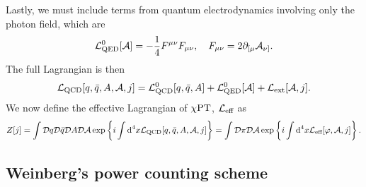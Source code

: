 Lastly, we must include terms from quantum electrodynamics involving only the photon field, which are
%
\begin{equation}
    \mathcal{L}^0_\text{QED}[\mathcal A] 
    = -\frac{1}{4} F^{\mu \nu}F_{\mu \nu}, \quad
    F_{\mu \nu} = 2 \partial_{[\mu}\mathcal A_{\nu]}.
\end{equation}
%
The full Lagrangian is then
%
\begin{equation}
    \mathcal{L}_\text{QCD}[q, \bar q, A,\mathcal A, j] = \mathcal{L}_\text{QCD}^0[q, \bar q, A] + \mathcal{L}^0_\text{QED}[\mathcal A] + \mathcal{L}_\text{ext}[\mathcal A, j].
\end{equation}
%
We now define the effective Lagrangian of $\chi \text{PT}$, $\mathcal{L}_\text{eff}$ as
%
\begin{equation}
    \label{definition effective lagrangian chpt}
    Z[j]
    = 
    \int \mathcal D q \mathcal D \bar q \mathcal D A \mathcal D \mathcal A\,
    \text{exp} \left\{ i\int \text{d}^4 x \mathcal{L}_\text{QCD}[q, \bar q, A, \mathcal A, j]  \right\}
    = 
    \int \mathcal D \pi \mathcal D \mathcal A\,
    \text{exp} \left\{ i\int \text{d}^4 x \mathcal{L}_\text{eff}[\varphi, \mathcal{A}, j]  \right\}.
\end{equation}


\subsection{Weinberg's power counting scheme}
\label{subsection: Weinberg's power counting scheme}
